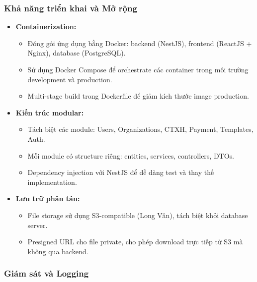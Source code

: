 \subsubsection{Khả năng triển khai và Mở rộng}

\begin{itemize}
    \item \textbf{Containerization:}
    \begin{itemize}
        \item Đóng gói ứng dụng bằng Docker: backend (NestJS), frontend (ReactJS + Nginx), database (PostgreSQL).
        \item Sử dụng Docker Compose để orchestrate các container trong môi trường development và production.
        \item Multi-stage build trong Dockerfile để giảm kích thước image production.
    \end{itemize}
    
    \item \textbf{Kiến trúc modular:}
    \begin{itemize}
        \item Tách biệt các module: Users, Organizations, CTXH, Payment, Templates, Auth.
        \item Mỗi module có structure riêng: entities, services, controllers, DTOs.
        \item Dependency injection với NestJS để dễ dàng test và thay thế implementation.
    \end{itemize}
    
    \item \textbf{Lưu trữ phân tán:}
    \begin{itemize}
        \item File storage sử dụng S3-compatible (Long Vân), tách biệt khỏi database server.
        \item Presigned URL cho file private, cho phép download trực tiếp từ S3 mà không qua backend.
    \end{itemize}
\end{itemize}

\subsubsection{Giám sát và Logging}

